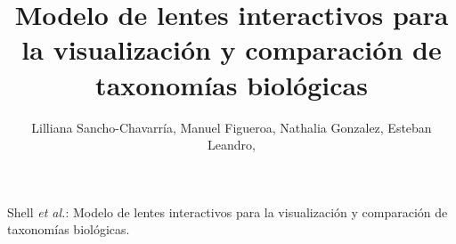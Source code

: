 \documentclass[journal]{IEEEtran}
\begin{document}
%
\title{ Modelo de lentes interactivos para la visualización y comparación de taxonomías biológicas }
%
%
%

\author{
        Lilliana Sancho-Chavarría, 
        Manuel Figueroa,
        Nathalia Gonzalez,
        Esteban Leandro,}%

% 
%



%
{Shell \MakeLowercase{\textit{et al.}}: Modelo de lentes interactivos para la visualización y comparación de taxonomías biológicas. }
% 
\end{document}

